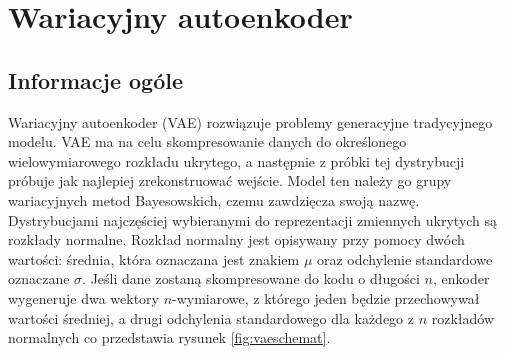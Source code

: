 \documentclass[a4paper,12pt,oneside]{book} %
\begin{document}
\chapter{Wariacyjny autoenkoder}
\section{Informacje ogóle}
Wariacyjny autoenkoder (VAE) rozwiązuje problemy generacyjne tradycyjnego modelu. VAE ma na celu skompresowanie danych do określonego wielowymiarowego rozkładu ukrytego, a następnie z próbki tej dystrybucji próbuje jak najlepiej zrekonstruować wejście. Model ten należy go grupy wariacyjnych metod Bayesowskich, czemu zawdzięcza swoją nazwę. Dystrybucjami najczęściej wybieranymi do reprezentacji zmiennych ukrytych są rozkłady normalne. Rozkład normalny jest opisywany przy pomocy dwóch wartości: średnia, która oznaczana jest znakiem $\mu$ oraz odchylenie standardowe oznaczane $\sigma$. Jeśli dane zostaną skompresowane do kodu o długości $n$, enkoder wygeneruje dwa wektory $n$-wymiarowe, z którego jeden będzie przechowywał wartości średniej, a drugi odchylenia standardowego dla każdego z $n$ rozkładów normalnych co przedstawia rysunek \ref{fig:vaeschemat}.
\end{document}
